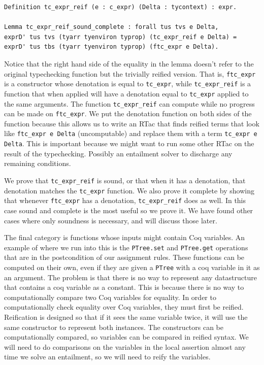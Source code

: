 \documentclass{puthesis}
\begin{document}
\begin{verbatim}
Definition tc_expr_reif (e : c_expr) (Delta : tycontext) : expr.

Lemma tc_expr_reif_sound_complete : forall tus tvs e Delta,
exprD' tus tvs (tyarr tyenviron typrop) (tc_expr_reif e Delta) =
exprD' tus tbs (tyarr tyenviron typrop) (ftc_expr e Delta).
\end{verbatim}

Notice that the right hand side of the equality in the lemma doesn't
refer to the original typechecking function but the trivially reified
version. That is, \lstinline|ftc_expr| is a constructor whose
denotation is equal to \lstinline|tc_expr|, while
\lstinline|tc_expr_reif| is a function that when applied will have a
denotation equal to \lstinline|tc_expr| applied to the same
arguments. The function \lstinline|tc_expr_reif| can compute while no
progress can be made on \lstinline|ftc_expr|.  We put the denotation
function on both sides of the function because this allows us to write
an RTac that finds reified terms that look like \lstinline|ftc_expr e Delta|
(uncomputable) and replace them with a term 
\lstinline|tc_expr e Delta|. This is important because we might want to run some other
RTac on the result of the typechecking. Possibly an entailment solver
to discharge any remaining conditions.

We prove that \lstinline|tc_expr_reif| is sound, or that when it has a
denotation, that denotation matches the \lstinline|tc_expr|
function. We also prove it complete by showing that whenever
\lstinline|ftc_expr| has a denotation, \lstinline|tc_expr_reif| does
as well.  In this case sound and complete is the most useful so we
prove it. We have found other cases where only soundness is necessary,
and will discuss those later.

The final category is functions whose inputs might contain Coq
variables. An example of where we run into this is the
\lstinline|PTree.set| and \lstinline|PTree.get| operations that are in
the postcondition of our assignment rules. These functions can be
computed on their own, even if they are given a \lstinline|PTree| with
a coq variable in it as an argument. The problem is that there is no
way to represent any datastructure that contains a coq variable as a
constant. This is because there is no way to computationally compare
two Coq variables for equality. In order to computationally check
equality over Coq variables, they must first be reified.  Reification
is designed so that if it sees the same variable twice, it will use
the same constructor to represent both instances. The constructors can
be computationally compared, so variables can be compared in reified
syntax.  We will need to do comparisons on the variables in the local
assertion almost any time we solve an entailment, so we will need to
reify the variables.
\end{document}
